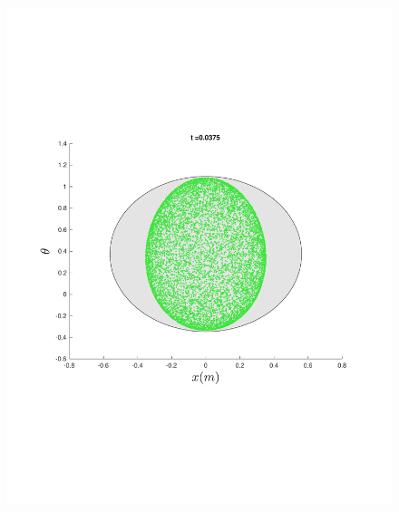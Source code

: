 \begin{figure}
{\begin{minipage}{0.5\textwidth}
\begin{minipage}[b]{0.5\textwidth}
        \includegraphics[width=\textwidth]{figures/method/FunnelSimOverlaid6funnel-1y-theta}
      \end{minipage}%
      \begin{minipage}[b]{0.5\textwidth}

\end{minipage}
\end{minipage}}
\end{figure}
